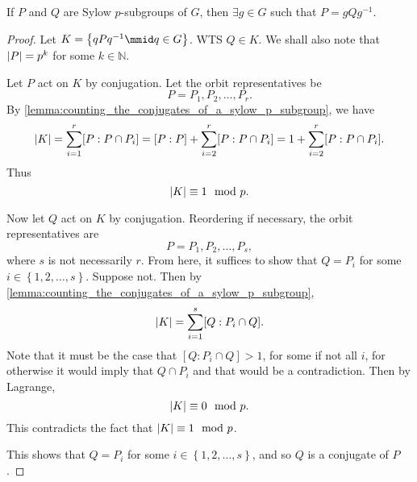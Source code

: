 \documentclass[notoc,notitlepage]{tufte-book}
\begin{document}
\begin{thm}\label{thm:second_sylow_theorem}
  If $P$ and $Q$ are Sylow $p$-subgroups of $G$, then
  $\exists g \in G$ such that $P = gQg^{-1}$.
\end{thm}

\begin{proof}
  Let $K = \left\{ qPq^{-1} \mmid q \in G \right\}$. WTS $Q \in K$.
  We shall also note that $\left|P\right| = p^k$ for some $k \in \mathbb{N}$.

  Let $P$ act on $K$ by conjugation. Let the orbit representatives be
  \begin{equation*}
    P = P_1, P_2, \ldots, P_r.
  \end{equation*}
  By \cref{lemma:counting_the_conjugates_of_a_sylow_p_subgroup}, we have
  \begin{equation*}
    \left|K\right| = \sum_{i=1}^{r} [ P : P \cap P_i ] 
            = [ P : P ] + \sum_{i=2}^{r} [ P : P \cap P_i ]
            = 1 + \sum_{i=2}^{r} [ P : P \cap P_i ].
  \end{equation*}
  Thus
  \begin{equation*}
    \left|K\right| \equiv 1 \mod p.
  \end{equation*}

  Now let $Q$ act on $K$ by conjugation. Reordering if necessary, the
  orbit representatives are
  \begin{equation*}
    P = P_1, P_2, \ldots, P_s,
  \end{equation*}
  where $s$ is not necessarily $r$. From here, it suffices to show that
  $Q = P_i$ for some $i \in \left\{ 1, 2, \ldots, s \right\}$. Suppose
  not. Then by \cref{lemma:counting_the_conjugates_of_a_sylow_p_subgroup},
  \begin{equation*}
    \left|K\right| = \sum_{i=1}^{s} [ Q : P_i \cap Q ].
  \end{equation*}
  Note that it must be the case that $[ Q : P_i \cap Q ] > 1$, for some if
  not all $i$, for otherwise it would imply that $Q \cap P_i$ and that would
  be a contradiction. Then by Lagrange,
  \begin{equation*}
    \left|K\right| \equiv 0 \mod p.
  \end{equation*}
  This contradicts the fact that $\left|K\right| \equiv 1 \mod p$.

  This shows that $Q = P_i$ for some $i \in \left\{ 1, 2, \ldots, s \right\}$,
  and so $Q$ is a conjugate of $P$.
\end{proof}
\end{document}
